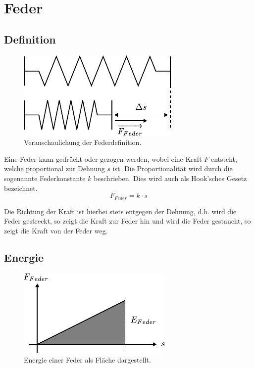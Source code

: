 \chapter{Feder}

\section{Definition}

\begin{figure}[h!]
	\centering
	\includegraphics[scale=0.75]{feder-dehnung.pdf}
	\caption{Veranschaulichung der Federdefinition.}
	\label{fig:feder-dehnung}
\end{figure}

\noindent
Eine Feder kann gedrückt oder gezogen werden, wobei eine Kraft $F$ entsteht,
welche proportional zur Dehnung $s$ ist. Die Proportionalität wird durch die
sogenannte Federkonstante $k$ beschrieben. Dies wird auch als Hook'sches
Gesetz bezeichnet.
\[ \boxed{F_{Feder} = k \cdot s} \]

\noindent
Die Richtung der Kraft ist hierbei stets entgegen der Dehnung, d.h. wird die
Feder gestreckt, so zeigt die Kraft zur Feder hin und wird die Feder
gestaucht, so zeigt die Kraft von der Feder weg.

\section{Energie}\label{sec:feder-energie}

\begin{figure}[h!]
	\centering
	\includegraphics[scale=0.9]{feder-energie.pdf}
	\caption{Energie einer Feder als Fläche dargestellt.}
	\label{fig:feder-energie}
\end{figure}

